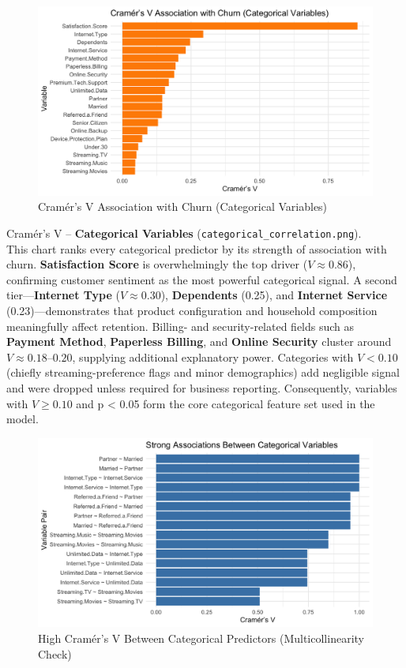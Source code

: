 \documentclass[
]{article}
\begin{document}
\begin{figure}

{\centering \includegraphics[width=0.85\linewidth]{glm_gam_plots/categorical_correlation} 

}

\caption{Cramér's V Association with Churn (Categorical Variables)}\label{fig:cat-corr-churn-img}
\end{figure}

Cramér's V -- \textbf{Categorical Variables}
(\texttt{categorical\_correlation.png}).\\
This chart ranks every categorical predictor by its strength of
association with churn. \textbf{Satisfaction Score} is overwhelmingly
the top driver (\(V \approx 0.86\)), confirming customer sentiment as
the most powerful categorical signal. A second tier---\textbf{Internet
Type} (\(V \approx 0.30\)), \textbf{Dependents} (0.25), and
\textbf{Internet Service} (0.23)---demonstrates that product
configuration and household composition meaningfully affect retention.
Billing- and security-related fields such as \textbf{Payment Method},
\textbf{Paperless Billing}, and \textbf{Online Security} cluster around
\(V \approx 0.18\)--\(0.20\), supplying additional explanatory power.
Categories with \(V < 0.10\) (chiefly streaming-preference flags and
minor demographics) add negligible signal and were dropped unless
required for business reporting. Consequently, variables with
\(V \geq 0.10\) and p \textless{} 0.05 form the core categorical feature
set used in the model.

\begin{figure}

{\centering \includegraphics[width=0.85\linewidth]{glm_gam_plots/cat_interior} 

}

\caption{High Cramér's V Between Categorical Predictors (Multicollinearity Check)}\label{fig:cat-interior-img}
\end{figure}
\end{document}

